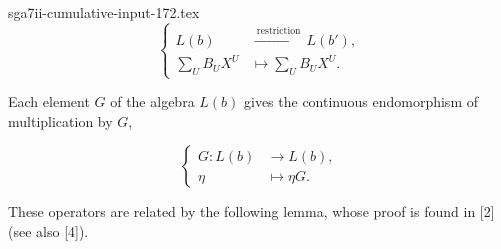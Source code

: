 \begin{filecontents*}{sga7ii-cumulative-input-172.tex}
\begin{equation}\tag{4.5.6}
\left\{
\begin{aligned}
L(b)&\xrightarrow{\ \text{restriction}\ }L(b'),\\
\sum_U B_UX^U&\longmapsto\sum_U B_UX^U.
\end{aligned}
\right.
\end{equation}

Each element $G$ of the algebra $L(b)$ gives the continuous endomorphism
of multiplication by $G$,

\begin{equation}\tag{4.5.7}
\left\{
\begin{aligned}
G:L(b)&\longrightarrow L(b),\\
\eta&\longmapsto\eta G.
\end{aligned}
\right.
\end{equation}

These operators are related by the following lemma, whose proof is found in
[2] (see also [4]).
\end{filecontents*}

